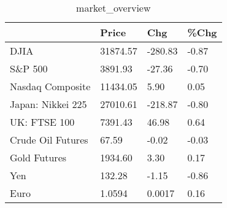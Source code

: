 \documentclass{article}%
\begin{document}
%


\begin{table}[htbp]%
\caption{market\_overview}%
\centering%
\begin{adjustbox}{width=1\textwidth}%
\begin{tabular}{llll}
\toprule
                  &    Price &     Chg &  \%Chg \\
\midrule
             DJIA & 31874.57 & -280.83 & -0.87 \\
          S\&P 500 &  3891.93 &  -27.36 & -0.70 \\
 Nasdaq Composite & 11434.05 &    5.90 &  0.05 \\
Japan: Nikkei 225 & 27010.61 & -218.87 & -0.80 \\
     UK: FTSE 100 &  7391.43 &   46.98 &  0.64 \\
Crude Oil Futures &    67.59 &   -0.02 & -0.03 \\
     Gold Futures &  1934.60 &    3.30 &  0.17 \\
              Yen &   132.28 &   -1.15 & -0.86 \\
             Euro &   1.0594 &  0.0017 &  0.16 \\
\bottomrule
\end{tabular}
%
\end{adjustbox}%
\end{table}

%
\end{document}
